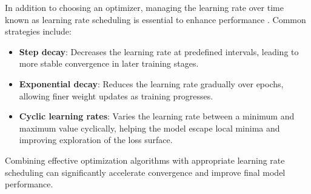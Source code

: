 In addition to choosing an optimizer, managing the learning rate over time known as learning rate scheduling is essential to enhance performance \parencite{zhao2019learningrate}. Common strategies include:

\begin{itemize}
    \item \textbf{Step decay}: Decreases the learning rate at predefined intervals, leading to more stable convergence in later training stages.
    \item \textbf{Exponential decay}: Reduces the learning rate gradually over epochs, allowing finer weight updates as training progresses.
    \item \textbf{Cyclic learning rates}: Varies the learning rate between a minimum and maximum value cyclically, helping the model escape local minima and improving exploration of the loss surface.
\end{itemize}

Combining effective optimization algorithms with appropriate learning rate scheduling can significantly accelerate convergence and improve final model performance.







    
    
